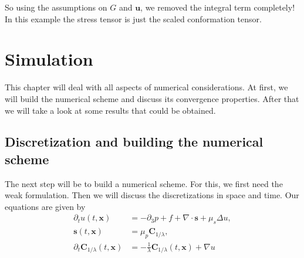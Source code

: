 \documentclass[12pt,a4paper,twoside, open=right]{scrreprt}
\theoremstyle{definition}
\theoremstyle{plain}
\newcommand{\bfu}{\bm{u}}
\newcommand{\bfs}{\bm{s}}
\newcommand{\bfC}{\bm{C}}
\newcommand{\bfx}{\bm{x}}
\begin{document}
So using the assumptions on $G$ and $\bfu$, we removed the integral term completely! In this example the stress tensor is just the scaled conformation tensor. 
\chapter{Simulation}
This chapter will deal with all aspects of numerical considerations. At first, we will build the numerical scheme and discuss its convergence properties. After that we will take a look at some results that could be obtained.
\section{Discretization and building the numerical scheme}
The next step will be to build a numerical scheme. For this, we first need the weak formulation. Then we will discuss the discretizations in space and time. Our equations are given by 
\begin{align}
    \label{eq:transfeq1}
    \partial_t u(t,\bfx) &= -\partial_3 p + f +\nabla\cdot \bfs+\mu_s\Delta u,\\
    \label{eq:transfeq2}
    \bfs(t,\bfx)&=\mu_p\bfC_{1/\lambda},\\
    \partial_t\bfC_{1/\lambda}(t,\bfx) &= -\frac{1}{\lambda}\bfC_{1/\lambda}(t,\bfx)+\nabla u
    \label{eq:transfeq3}
\end{align}
\end{document}
